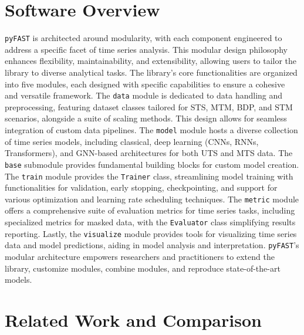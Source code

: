 \documentclass{article}
\begin{document}
\section{Software Overview}
\texttt{pyFAST} is architected around modularity, with each component engineered to address a specific facet of time series analysis. This modular design philosophy enhances flexibility, maintainability, and extensibility, allowing users to tailor the library to diverse analytical tasks. The library’s core functionalities are organized into five modules, each designed with specific capabilities to ensure a cohesive and versatile framework. The \texttt{data} module is dedicated to data handling and preprocessing, featuring dataset classes tailored for STS, MTM, BDP, and STM scenarios, alongside a suite of scaling methods. This design allows for seamless integration of custom data pipelines.  The \texttt{model} module hosts a diverse collection of time series models, including classical, deep learning (CNNs, RNNs, Transformers), and GNN-based architectures for both UTS and MTS data. The \texttt{base} submodule provides fundamental building blocks for custom model creation.  The \texttt{train} module provides the \texttt{Trainer} class, streamlining model training with functionalities for validation, early stopping, checkpointing, and support for various optimization and learning rate scheduling techniques. The \texttt{metric} module offers a comprehensive suite of evaluation metrics for time series tasks, including specialized metrics for masked data, with the \texttt{Evaluator} class simplifying results reporting.  Lastly, the \texttt{visualize} module provides tools for visualizing time series data and model predictions, aiding in model analysis and interpretation. \texttt{pyFAST}'s modular architecture empowers researchers and practitioners to extend the library, customize modules, combine modules, and reproduce state-of-the-art models.

\section{Related Work and Comparison}
\end{document}
